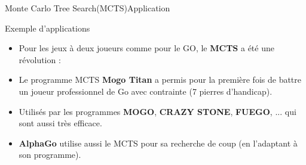 \begin{frame}{Monte Carlo Tree Search(MCTS)}{Application}
	\begin{block}{Exemple d'applications}
		\begin{itemize}
			\item Pour les jeux à deux joueurs comme pour le GO, le \textbf{MCTS} a été une révolution :
			\item Le programme MCTS \textbf{Mogo Titan} a permis pour la première fois de battre un joueur professionnel de Go avec contrainte (7 pierres d'handicap).
			\item Utilisés par les programmes \textbf{MOGO}, \textbf{CRAZY STONE}, \textbf{FUEGO}, ... qui sont aussi très efficace.
			\item \textbf{AlphaGo} utilise aussi le MCTS pour sa recherche de coup (en l'adaptant à son programme).

		\end{itemize}
	\end{block}
\end{frame}